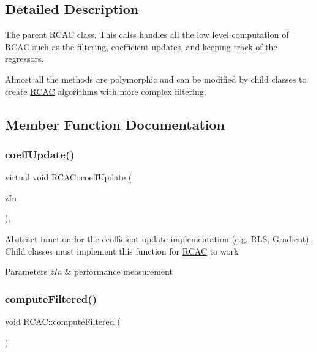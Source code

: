 \subsection{Detailed Description}
The parent \hyperlink{class_r_c_a_c}{R\+C\+AC} class. This calss handles all the low level computation of \hyperlink{class_r_c_a_c}{R\+C\+AC} such as the filtering, coefficient updates, and keeping track of the regressors.

Almost all the methods are polymorphic and can be modified by child classes to create \hyperlink{class_r_c_a_c}{R\+C\+AC} algorithms with more complex filtering. 

\subsection{Member Function Documentation}
\mbox{\label{class_r_c_a_c_a5ac60fc4b359cf5555427bd1652d6ca1}} 
\subsubsection{\texorpdfstring{coeff\+Update()}{coeffUpdate()}}
{\footnotesize\ttfamily virtual void R\+C\+A\+C\+::coeff\+Update (\begin{DoxyParamCaption}\item[{Eigen\+::\+Vector\+Xd \&}]{z\+In }\end{DoxyParamCaption})\hspace{0.3cm}{\ttfamily [protected]}, {}}

Abstract function for the ceofficient update implementation (e.\+g. R\+LS, Gradient). Child classes must implement this function for \hyperlink{class_r_c_a_c}{R\+C\+AC} to work


\begin{DoxyParams}{Parameters}
{\em z\+In} & performance measurement \\
\hline
\end{DoxyParams}
\mbox{\label{class_r_c_a_c_a5e6bc7050ced3b1be7d9060d089dccfb}} 
\subsubsection{\texorpdfstring{compute\+Filtered()}{computeFiltered()}}
{\footnotesize\ttfamily void R\+C\+A\+C\+::compute\+Filtered (\begin{DoxyParamCaption}{ }\end{DoxyParamCaption})\hspace{0.3cm}{\ttfamily [protected]}}

